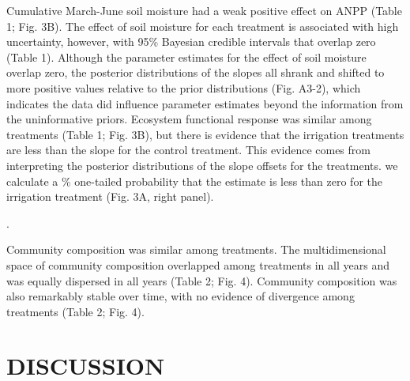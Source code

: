 \documentclass[fleqn,10pt,lineno]{wlpeerj} %
\begin{document}
Cumulative March-June soil moisture had a weak positive effect on ANPP
(Table 1; Fig. 3B). The effect of soil moisture for each treatment is
associated with high uncertainty, however, with 95\% Bayesian credible
intervals that  overlap zero (Table 1). Although the
parameter estimates for the effect of soil moisture overlap zero, the
posterior distributions of the slopes all shrank and shifted to more
positive values relative to the prior distributions (Fig. A3-2), which
indicates the data did influence parameter estimates beyond the
information from the uninformative priors. Ecosystem functional response
was similar among treatments (Table 1; Fig. 3B), but there is evidence
that the  irrigation treatments are less
than the slope for the control treatment. This evidence comes from
interpreting the posterior distributions of the slope offsets for the
treatments.  we calculate a \%
one-tailed probability that the estimate is less than zero for the
irrigation treatment
(Fig. 3A, right panel).

.

Community composition was similar among treatments. The multidimensional
space of community composition overlapped among treatments in all years
and was equally dispersed in all years (Table 2; Fig. 4). Community
composition was also remarkably stable over time, with no evidence of
divergence among treatments (Table 2; Fig. 4).

\hypertarget{discussion}{%
\section{DISCUSSION}\label{discussion}}
\end{document}
